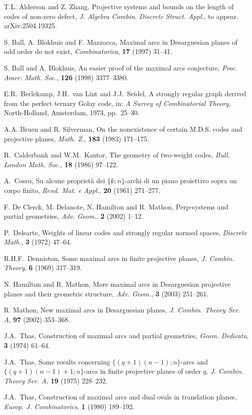 \documentclass[12pt, twoside]{article}
\begin{document}
	
	\begin{thebibliography}{}
		
		T.L. Alderson and Z. Zhang, Projective systems and bounds on the length of codes of non-zero defect, {\it J. Algebra Combin. Discrete Struct. Appl.}, to appear. arXiv:2504.19325.
		
		S. Ball, A. Blokhuis and F. Mazzocca, Maximal arcs in Desarguesian planes of odd order do not exist, {\it Combinatorica}, {\bf 17} (1997) 31--41.
		
		S. Ball and A. Blokhuis, An easier proof of the maximal arcs conjecture, {\it Proc. Amer. Math. Soc.}, {\bf 126} (1998) 3377--3380.
		
		E.R.\ Berlekamp, J.H.\ van Lint and J.J.\ Seidel, A strongly regular graph derived from the perfect ternary Golay code, in: {\it A Survey of Combinatorial Theory}, North-Holland, Amsterdam, 1973, pp.\ 25--30.

		A.A. Bruen and R. Silverman, On the nonexistence of certain M.D.S. codes and projective planes, {\it Math. Z.}, {\bf 183} (1983) 171--175.
		
		R.\ Calderbank and W.M.\ Kantor, The geometry of two-weight codes, {\it Bull. London Math. Soc.}, {\bf 18} (1986) 97--122.

		A.\ Cossu, Su alcune propriet\`{a} dei $\{k;n\}$-archi di un piano proiettivo sopra un corpo finito, {\it Rend. Mat. e Appl.}, {\bf 20} (1961) 271--277.
		
		F. De Clerck, M. Delanote, N. Hamilton and R. Mathon, Perp-systems and partial geometries, {\it Adv. Geom.}, {\bf 2} (2002) 1--12.
		
		P.\ Delsarte, Weights of linear codes and strongly regular normed spaces, {\it Discrete Math.}, {\bf 3} (1972) 47--64.

		R.H.F.\ Denniston, Some maximal arcs in finite projective planes, {\it J. Combin. Theory}, {\bf 6} (1969) 317--319.
		
		N. Hamilton and R. Mathon, More maximal arcs in Desarguesian projective planes and their geometric structure, {\it Adv. Geom.}, {\bf 3} (2003) 251--261.
		
		R. Mathon, New maximal arcs in Desarguesian planes, {\it J. Combin. Theory Ser. A}, {\bf 97} (2002) 353--368.
		
		J.A.\ Thas, Construction of maximal arcs and partial geometries, {\it Geom. Dedicata}, {\bf 3} (1974) 61--64.
		
		J.A.\ Thas, Some results concerning $\{(q+1)(n-1);n\}$-arcs and $\{(q+1)(n-1)+1;n\}$-arcs in finite projective planes of order $q$, {\it J. Combin. Theory Ser. A}, {\bf 19} (1975) 228--232.
		
		J.A.\ Thas, Construction of maximal arcs and dual ovals in translation planes, {\it Europ. J. Combinatorics}, {\bf 1} (1980) 189--192.
		
	\end{thebibliography}
	
\end{document}
